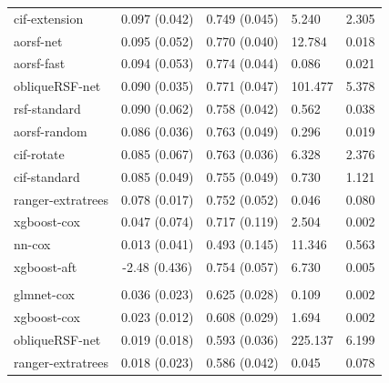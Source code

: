 \documentclass[twoside,11pt]{article}\usepackage[]{graphicx}\usepackage[]{xcolor}
\newenvironment{knitrout}{}{} %
\begin{document}
\begin{knitrout}
\begin{longtable}[t]{lcclc}
\hspace{1em}cif-extension & 0.097 (0.042) & 0.749 (0.045) & 5.240 & 2.305\\
\hspace{1em}aorsf-net & 0.095 (0.052) & 0.770 (0.040) & 12.784 & 0.018\\
\hspace{1em}aorsf-fast & 0.094 (0.053) & 0.774 (0.044) & 0.086 & 0.021\\
\hspace{1em}obliqueRSF-net & 0.090 (0.035) & 0.771 (0.047) & 101.477 & 5.378\\
\hspace{1em}rsf-standard & 0.090 (0.062) & 0.758 (0.042) & 0.562 & 0.038\\
\hspace{1em}aorsf-random & 0.086 (0.036) & 0.763 (0.049) & 0.296 & 0.019\\
\hspace{1em}cif-rotate & 0.085 (0.067) & 0.763 (0.036) & 6.328 & 2.376\\
\hspace{1em}cif-standard & 0.085 (0.049) & 0.755 (0.049) & 0.730 & 1.121\\
\hspace{1em}ranger-extratrees & 0.078 (0.017) & 0.752 (0.052) & 0.046 & 0.080\\
\hspace{1em}xgboost-cox & 0.047 (0.074) & 0.717 (0.119) & 2.504 & 0.002\\
\hspace{1em}nn-cox & 0.013 (0.041) & 0.493 (0.145) & 11.346 & 0.563\\
\hspace{1em}xgboost-aft & -2.48 (0.436) & 0.754 (0.057) & 6.730 & 0.005\\
\addlinespace[0.3em]
\hline
\multicolumn{5}{l}{\textit{\textbf{FCL; relapse, n = 541, p = 7}}}\\
\hline
\hspace{1em}glmnet-cox & 0.036 (0.023) & 0.625 (0.028) & 0.109 & 0.002\\
\hspace{1em}xgboost-cox & 0.023 (0.012) & 0.608 (0.029) & 1.694 & 0.002\\
\hspace{1em}obliqueRSF-net & 0.019 (0.018) & 0.593 (0.036) & 225.137 & 6.199\\
\hspace{1em}ranger-extratrees & 0.018 (0.023) & 0.586 (0.042) & 0.045 & 0.078\\

\end{longtable}
\end{knitrout}
\end{document}
